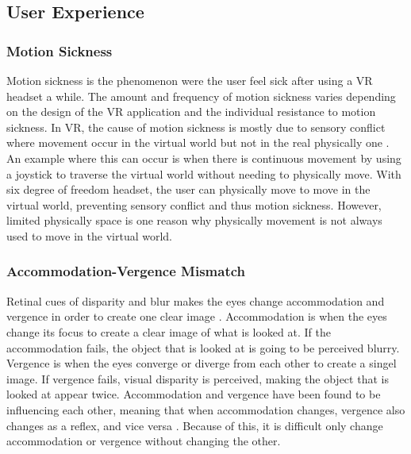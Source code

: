\documentclass{sigchi}
\begin{document}
\subsection{User Experience}

\subsubsection{Motion Sickness}
Motion sickness is the phenomenon were the user feel sick after using a VR headset a while. The amount and frequency of motion sickness varies depending on the design of the VR application and the individual resistance to motion sickness. In VR, the cause of motion sickness is mostly due to sensory conflict where movement occur in the virtual world but not in the real physically one \cite{golding_motion_2006}. An example where this can occur is when there is continuous movement by using a joystick to traverse the virtual world without needing to physically move. With six degree of freedom headset, the user can physically move to move in the virtual world, preventing sensory conflict and thus motion sickness. However, limited physically space is one reason why physically movement is not always used to move in the virtual world.


\subsubsection{Accommodation-Vergence Mismatch}
Retinal cues of disparity and blur makes the eyes change accommodation and vergence in order to create one clear image \cite{reichelt_depth_2010}. Accommodation is when the eyes change its focus to create a clear image of what is looked at. If the accommodation fails, the object that is looked at is going to be perceived blurry. Vergence is when the eyes converge or diverge from each other to create a singel image. If vergence fails, visual disparity is perceived, making the object that is looked at appear twice. Accommodation and vergence have been found to be influencing each other, meaning that when accommodation changes, vergence also changes as a reflex, and vice versa \cite{suryakumar_vergence_2007}. Because of this, it is difficult only change accommodation or vergence without changing the other.
\end{document}
